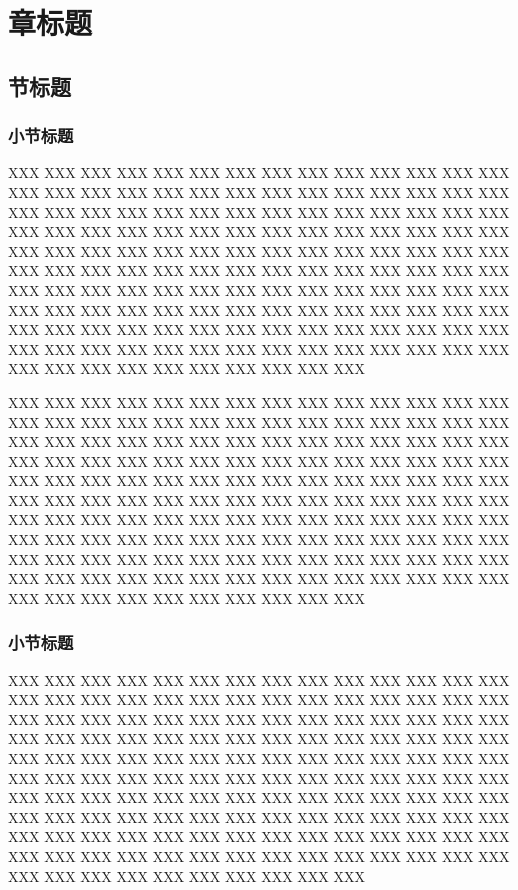 \chapter{章标题}

\section{节标题}

\subsection{小节标题}

XXX XXX XXX XXX XXX XXX XXX XXX XXX XXX XXX XXX XXX XXX XXX
XXX XXX XXX XXX XXX XXX XXX XXX XXX XXX XXX XXX XXX XXX XXX
XXX XXX XXX XXX XXX XXX XXX XXX XXX XXX XXX XXX XXX XXX XXX
XXX XXX XXX XXX XXX XXX XXX XXX XXX XXX XXX XXX XXX XXX XXX
XXX XXX XXX XXX XXX XXX XXX XXX XXX XXX XXX XXX XXX XXX XXX
XXX XXX XXX XXX XXX XXX XXX XXX XXX XXX XXX XXX XXX XXX XXX
XXX XXX XXX XXX XXX XXX XXX XXX XXX XXX XXX XXX XXX XXX XXX
XXX XXX XXX XXX XXX XXX XXX XXX XXX XXX XXX XXX XXX XXX XXX
XXX XXX XXX XXX XXX XXX XXX XXX XXX XXX XXX XXX XXX XXX XXX
XXX XXX XXX XXX XXX XXX XXX XXX XXX XXX XXX XXX XXX XXX XXX

XXX XXX XXX XXX XXX XXX XXX XXX XXX XXX XXX XXX XXX XXX XXX
XXX XXX XXX XXX XXX XXX XXX XXX XXX XXX XXX XXX XXX XXX XXX
XXX XXX XXX XXX XXX XXX XXX XXX XXX XXX XXX XXX XXX XXX XXX
XXX XXX XXX XXX XXX XXX XXX XXX XXX XXX XXX XXX XXX XXX XXX
XXX XXX XXX XXX XXX XXX XXX XXX XXX XXX XXX XXX XXX XXX XXX
XXX XXX XXX XXX XXX XXX XXX XXX XXX XXX XXX XXX XXX XXX XXX
XXX XXX XXX XXX XXX XXX XXX XXX XXX XXX XXX XXX XXX XXX XXX
XXX XXX XXX XXX XXX XXX XXX XXX XXX XXX XXX XXX XXX XXX XXX
XXX XXX XXX XXX XXX XXX XXX XXX XXX XXX XXX XXX XXX XXX XXX
XXX XXX XXX XXX XXX XXX XXX XXX XXX XXX XXX XXX XXX XXX XXX

\subsection{小节标题}

XXX XXX XXX XXX XXX XXX XXX XXX XXX XXX XXX XXX XXX XXX XXX
XXX XXX XXX XXX XXX XXX XXX XXX XXX XXX XXX XXX XXX XXX XXX
XXX XXX XXX XXX XXX XXX XXX XXX XXX XXX XXX XXX XXX XXX XXX
XXX XXX XXX XXX XXX XXX XXX XXX XXX XXX XXX XXX XXX XXX XXX
XXX XXX XXX XXX XXX XXX XXX XXX XXX XXX XXX XXX XXX XXX XXX
XXX XXX XXX XXX XXX XXX XXX XXX XXX XXX XXX XXX XXX XXX XXX
XXX XXX XXX XXX XXX XXX XXX XXX XXX XXX XXX XXX XXX XXX XXX
XXX XXX XXX XXX XXX XXX XXX XXX XXX XXX XXX XXX XXX XXX XXX
XXX XXX XXX XXX XXX XXX XXX XXX XXX XXX XXX XXX XXX XXX XXX
XXX XXX XXX XXX XXX XXX XXX XXX XXX XXX XXX XXX XXX XXX XXX

